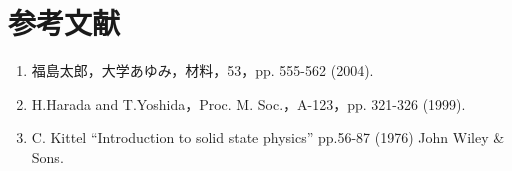\section*{参考文献}
    \begin{enumerate}
        \item 福島太郎，大学あゆみ，材料，53，pp. 555-562 (2004).
        \item H.Harada and T.Yoshida，Proc. M. Soc.，A-123，pp. 321-326 (1999).
        \item C. Kittel “Introduction to solid state physics” pp.56-87 (1976) John Wiley \& Sons.
    \end{enumerate}
